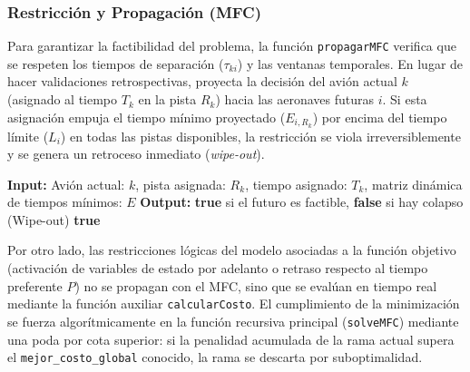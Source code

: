 \documentclass[12pt]{article}
\begin{document}
\subsubsection{Restricción y Propagación (MFC)}

Para garantizar la factibilidad del problema, la función \texttt{propagarMFC} verifica que se respeten los tiempos de separación ($\tau_{ki}$) y las ventanas temporales. En lugar de hacer validaciones retrospectivas, proyecta la decisión del avión actual $k$ (asignado al tiempo $T_k$ en la pista $R_k$) hacia las aeronaves futuras $i$. Si esta asignación empuja el tiempo mínimo proyectado ($E_{i, R_k}$) por encima del tiempo límite ($L_i$) en todas las pistas disponibles, la restricción se viola irreversiblemente y se genera un retroceso inmediato (\textit{wipe-out}).

\begin{algorithm}[H]
\vspace{1mm}
\textbf{Input:} Avión actual: $k$, pista asignada: $R_k$, tiempo asignado: $T_k$, matriz dinámica de tiempos mínimos: $E$\;
\textbf{Output:} \textbf{true} si el futuro es factible, \textbf{false} si hay colapso (Wipe-out)\;
\vspace{1mm}
\Return \textbf{true}\;
\vspace{1mm}
\caption{propagarMFC (Verificación de Restricciones Lógicas)}
\end{algorithm}

Por otro lado, las restricciones lógicas del modelo asociadas a la función objetivo (activación de variables de estado por adelanto o retraso respecto al tiempo preferente $P$) no se propagan con el MFC, sino que se evalúan en tiempo real mediante la función auxiliar \texttt{calcularCosto}. El cumplimiento de la minimización se fuerza algorítmicamente en la función recursiva principal (\texttt{solveMFC}) mediante una poda por cota superior: si la penalidad acumulada de la rama actual supera el \texttt{mejor\_costo\_global} conocido, la rama se descarta por suboptimalidad.
\end{document}
